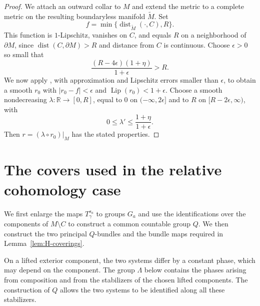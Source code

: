 \documentclass[12pt,reqno]{amsart}
\numberwithin{equation}{section}
\theoremstyle{definition}
\newcommand{\dist}{\operatorname{dist}}
\begin{document}
\begin{proof}
We attach an outward collar to $M$ and extend the metric to a complete
metric on the resulting boundaryless manifold $\widetilde M$.  Set
\[
 f=\min\{\dist_{\widetilde M}(\mathord\cdot,C),R\}.
\]
This function is $1$-Lipschitz, vanishes on $C$, and equals $R$ on a
neighborhood of $\partial M$, since
$\dist(C,\partial M)>R$ and distance from $C$ is continuous.  Choose
$\epsilon>0$ so small that
\[
 \frac{(R-4\epsilon)(1+\eta)}{1+\epsilon}>R.
\]
We now apply \cite[Theorem~1]{AzagraSmooth}, with approximation and Lipschitz
errors smaller than $\epsilon$, to obtain a smooth $r_0$ with
$|r_0-f|<\epsilon$ and $\operatorname{Lip}(r_0)<1+\epsilon$.
Choose a smooth nondecreasing $\lambda:\mathbb R\to[0,R]$, equal to
$0$ on $(-\infty,2\epsilon]$ and to $R$ on
$[R-2\epsilon,\infty)$, with
\[
 0\leq\lambda'\leq\frac{1+\eta}{1+\epsilon}.
\]
Then $r=(\lambda\circ r_0)|_M$ has the stated properties.
\end{proof}




\vspace{0.5cm}


\section{The covers used in the relative cohomology case}
\label{app:common-cover}

We first enlarge the maps $T^{s_a}_\gamma$ to groups $G_a$ and
use the identifications over the components of $M\setminus C$ to
construct a common countable group $Q$.  We then construct the two
principal $Q$-bundles and the bundle maps required in
Lemma~\ref{lem:H-coverings}.

On a lifted exterior component, the two systems differ by a
constant phase, which may depend on the component.  The group
$\Lambda$ below contains the phases arising from composition and
from the stabilizers of the chosen lifted components. The
construction of $Q$ allows the two systems to be identified along
all these stabilizers.
\end{document}
